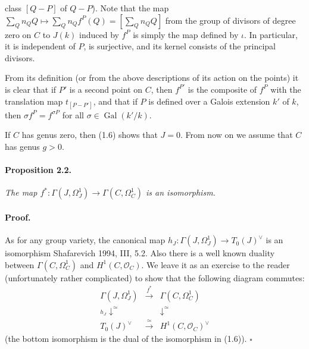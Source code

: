 

class $[Q-P]$ of $Q-P$). Note that the map
$\sum_Q n_QQ \mapsto \sum_Q n_Qf^P(Q) = [\sum_Q n_QQ]$ from the group of
divisors of degree zero on $C$ to $J(k)$ induced by $f^P$ is simply the map
defined by $\iota$. In particular, it is independent of $P$, is surjective,
and its kernel consists of the principal divisors.

From its definition (or from the above descriptions of its action on the
points) it is clear that if $P'$ is a second point on $C$, then $f^{P'}$ is
the composite of $f^P$ with the translation map $t_{[P-P']}$, and that if
$P$ is defined over a Galois extension $k'$ of $k$, then
$\sigma f^P = f^{\sigma P}$ for all $\sigma \in \operatorname{Gal}(k'/k)$.

If $C$ has genus zero, then (1.6) shows that $J = 0$. From now on we assume
that $C$ has genus $g > 0$.

\paragraph{Proposition 2.2.}
\textit{The map
$f^* \colon \Gamma(J, \Omega_J^1) \to \Gamma(C, \Omega_C^1)$ is an
isomorphism.}

\paragraph{Proof.}
As for any group variety, the canonical map
$h_J \colon \Gamma(J, \Omega_J^1) \to T_0(J)^\vee$ is an isomorphism
Shafarevich 1994, III, 5.2. Also there is a well known duality between
$\Gamma(C, \Omega_C^1)$ and $H^1(C, \mathcal{O}_C)$. We leave it as an
exercise to the reader (unfortunately rather complicated) to show that the
following diagram commutes:
\[
\begin{array}{ccc}
  \Gamma(J, \Omega_J^1) & \xrightarrow{\ f^*\ } &
    \Gamma(C, \Omega_C^1) \\
  {}_{h_J}\!\downarrow^{\simeq} && \downarrow^{\simeq} \\
  T_0(J)^\vee & \xrightarrow{\ \simeq\ } & H^1(C, \mathcal{O}_C)^\vee
\end{array}
\]
(the bottom isomorphism is the dual of the isomorphism in (1.6)).
\hfill $\square$

